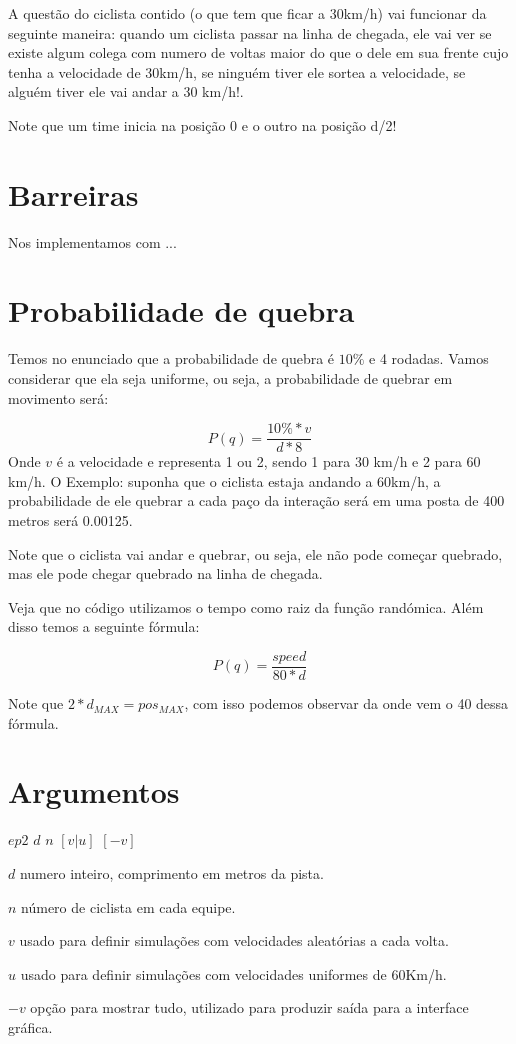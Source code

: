 \documentclass[]{scrartcl}
\begin{document}
A questão do ciclista contido (o que tem que ficar a 30km/h) vai funcionar da seguinte maneira: quando um ciclista passar na linha de chegada, ele vai ver se existe algum colega com numero de voltas maior do que o dele em sua frente cujo tenha a velocidade de 30km/h, se ninguém tiver ele sortea a velocidade, se alguém tiver ele vai andar a 30 km/h!.

Note que um time inicia na posição 0 e o outro na posição d/2!


\section{Barreiras}
	Nos implementamos com ...
	
\section{Probabilidade de quebra}
	Temos no enunciado que a probabilidade de quebra é $10\%$ e 4 rodadas. Vamos considerar que ela seja uniforme, ou seja, a probabilidade de quebrar em movimento será:
	
	$$
	P(q) = \frac{10\% * v}{d*8}
	$$
	Onde $v$ é a velocidade e representa 1 ou 2, sendo 1 para 30 km/h e 2 para 60 km/h. O Exemplo: suponha que o ciclista estaja andando a 60km/h, a probabilidade de ele quebrar a cada paço da interação será em uma posta de 400 metros será  0.00125.
	
	Note que o ciclista vai andar e quebrar, ou seja, ele não pode começar quebrado, mas ele pode chegar quebrado na linha de chegada.
	
	Veja que no código utilizamos o tempo como raiz da função randómica. Além disso temos a seguinte fórmula:
	
	$$
	P(q) = \frac{speed}{80*d}
	$$ 
	
	Note que $2 * d_{MAX} = pos_{MAX}$, com isso podemos observar da onde vem o 40 dessa fórmula. 


\section{Argumentos}

\begin{center}
	$ep2$ $d$ $n$ $[v|u]$ $[-v]$
\end{center}

$d$ numero inteiro, comprimento em metros da pista.

$n$ número de ciclista em cada equipe.

$v$ usado para definir simulações com velocidades aleatórias a cada volta. 

$u$ usado para definir simulações com velocidades uniformes de 60Km/h.

$-v$ opção para mostrar tudo, utilizado para produzir saída para a interface gráfica.
\end{document}
